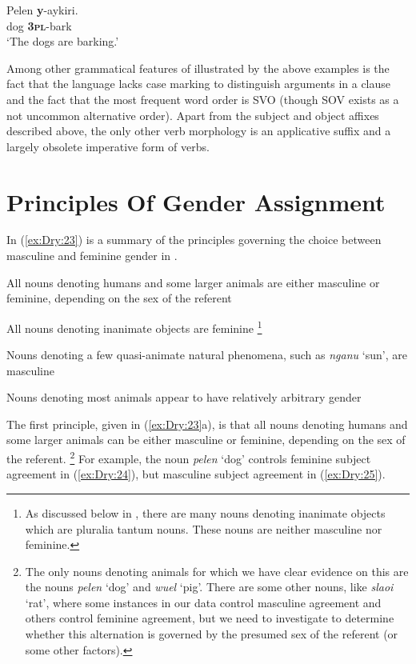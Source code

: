 \documentclass[output=collectionpaper]{langsci/langscibook}
\begin{document}
\ea \label{ex:Dry:22}
\gll Pelen	\textbf{y}-aykiri. \\
dog \textbf{\textsc{3pl}}-bark\\
\glt  `The dogs are barking.'
\z

Among other grammatical features of  illustrated by the above examples is the fact that the language lacks case marking to distinguish arguments in a clause and the fact that the most frequent word order is SVO (though SOV exists as a not uncommon alternative order). Apart from the subject and object affixes described above, the only other verb morphology is an applicative suffix and a largely obsolete imperative form of verbs.

\section{Principles Of Gender Assignment}
\label{sec:Dry:3}

In (\ref{ex:Dry:23}) is a summary of the principles governing the choice between masculine and feminine gender in .

\ea%
    \label{ex:Dry:23}
\begin{xlist}
\ex  All nouns denoting humans and some larger animals are either masculine or feminine, depending on the sex of the referent

\ex  All nouns denoting inanimate objects are feminine%
\footnote{As discussed below in , there are many nouns denoting inanimate objects which are pluralia tantum nouns. These nouns are neither masculine nor feminine.}

\ex  Nouns denoting a few quasi-animate natural phenomena, such as \textit{nganu} `sun', are masculine

\ex  Nouns denoting most animals appear to have relatively arbitrary gender
\end{xlist}
\z

The first principle, given in (\ref{ex:Dry:23}a), is that all nouns denoting humans and some larger animals can be either masculine or feminine, depending on the sex of the referent.%
\footnote{The only nouns denoting animals for which we have clear evidence on this are the nouns \textit{pelen} `dog' and \textit{wuel} `pig'. There are some other nouns, like \textit{slaoi} `rat', where some instances in our data control masculine agreement and others control feminine agreement, but we need to investigate to determine whether this alternation is governed by the presumed sex of the referent (or some other factors).} %
For example, the noun \textit{pelen} `dog' controls feminine subject agreement in (\ref{ex:Dry:24}), but masculine subject agreement in (\ref{ex:Dry:25}).
\end{document}
